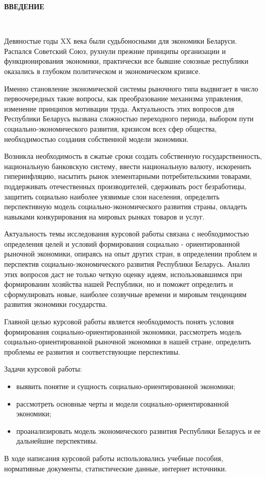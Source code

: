 \documentclass[14pt,a4paper]{article}
\begin{document}
    \newpage
    \begin{center}
        \textbf{\LARGE{ВВЕДЕНИЕ}}
    \end{center}
    \\
    \par
    Девяностые годы XX века были судьбоносными для экономики Беларуси. Распался Советский Союз, рухнули прежние принципы организации и функционирования экономики, практически все бывшие союзные республики оказались в глубоком политическом и экономическом кризисе.
    \par
    Именно становление экономической системы рыночного типа выдвигает в число первоочередных такие вопросы, как преобразование механизма управления, изменение принципов мотивации труда. Актуальность этих вопросов для Республики Беларусь вызвана сложностью переходного периода, выбором пути социально-экономического развития, кризисом всех сфер общества, необходимостью создания собственной модели экономики.
    \par
    Возникла необходимость в сжатые сроки создать собственную государственность, национальную банковскую систему, ввести национальную валюту, искоренить гиперинфляцию, насытить рынок элементарными потребительскими товарами, поддерживать отечественных производителей, сдерживать рост безработицы, защитить социально наиболее уязвимые слои населения, определить перспективную модель социально-экономического развития страны, овладеть навыками конкурирования на мировых рынках товаров и услуг.
    \par
    Актуальность темы исследования курсовой работы связана с необходимостью определения целей и условий формирования социально - ориентированной рыночной экономики, опираясь на опыт других стран, в определении проблем и перспектив социально-экономического развития Республики Беларусь. Анализ этих вопросов даст не только четкую оценку идеям, использовавшимся при формировании хозяйства нашей Республики, но и поможет определить и сформулировать новые, наиболее созвучные времени и мировым тенденциям развития экономики государства.
    \par
    Главной целью курсовой работы является необходимость понять условия формирования социально-ориентированной экономики, рассмотреть модель социально-ориентированной рыночной экономики в нашей стране, определить проблемы ее развития и соответствующие перспективы.
    \par
    Задачи курсовой работы:
    \begin{itemize}
        \item выявить понятие и сущность социально-ориентированной экономики;
        \item рассмотреть основные черты и модели социально-ориентированной экономики;
        \item проанализировать модель экономического развития Республики Беларусь и ее дальнейшие перспективы.
    \end{itemize}
    \par
    В ходе написания курсовой работы использовались учебные пособия, нормативные документы, статистические данные, интернет источники.
\end{document}
